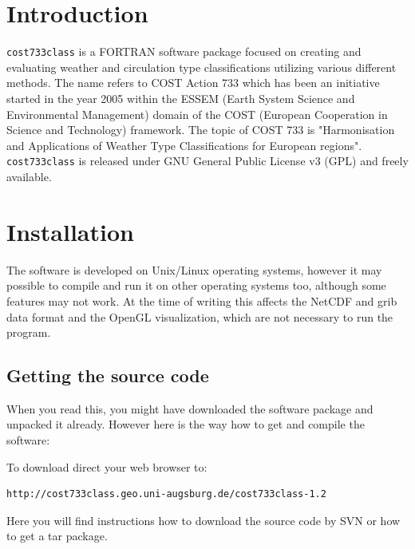 \documentclass[12pt, oneside, a4paper, headsepline, plainheadsepline]{scrbook}
\begin{document}
\tableofcontents

\newpage
{}
\pagestyle{scrheadings} 
\clearscrheadfoot
\ihead[\headmark]{\headmark}
\ohead[\pagemark]{\pagemark}

\chapter{Introduction}



\verb+cost733class+ is a FORTRAN software package focused on creating and evaluating weather and 
circulation type classifications utilizing various different methods.
The name refers to COST Action 733 which has been an initiative started in the year 2005 within the ESSEM 
(Earth System Science and Environmental Management) domain of the COST (European Cooperation in 
Science and Technology) framework. The topic of COST 733 is "Harmonisation and Applications of Weather 
Type Classifications for European regions". \verb+cost733class+ is released under GNU General Public License v3 (GPL)
and freely available.



\chapter{Installation}
The software is developed on Unix/Linux operating systems, however it may possible to compile and run it
on other operating systems too, although some features may not work. At the time of writing this affects 
the NetCDF and grib data format and the OpenGL visualization, which are not necessary to run the program.

\section{Getting the source code}

When you read this, you might have downloaded the software package and unpacked it already. 
However here is the way how to get and compile the software:

To download direct your web browser to:
\begin{lstlisting}
http://cost733class.geo.uni-augsburg.de/cost733class-1.2
\end{lstlisting}
Here you will find instructions how to download the source code by SVN or how to get a tar package.
\end{document}
